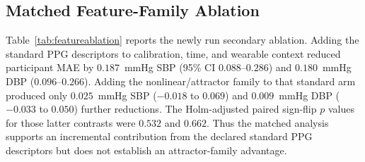 \documentclass[journal]{IEEEtran}
\begin{document}
\subsection{Matched Feature-Family Ablation}
\label{sec:featureablation}
Table~\ref{tab:featureablation} reports the newly run secondary ablation. Adding the standard PPG descriptors to calibration, time, and wearable context reduced participant MAE by $0.187$~mmHg SBP (95\% CI $0.088$--$0.286$) and $0.180$~mmHg DBP ($0.096$--$0.266$). Adding the nonlinear/attractor family to that standard arm produced only $0.025$~mmHg SBP ($-0.018$ to $0.069$) and $0.009$~mmHg DBP ($-0.033$ to $0.050$) further reductions. The Holm-adjusted paired sign-flip $p$ values for those latter contrasts were $0.532$ and $0.662$. Thus the matched analysis supports an incremental contribution from the declared standard PPG descriptors but does not establish an attractor-family advantage.
\begin{table}[t]
\centering
\caption{Secondary Matched AuroraBP Feature-Family Ablation (653 Participants)}
\label{tab:featureablation}
\scriptsize
{}
\end{table}
\end{document}
